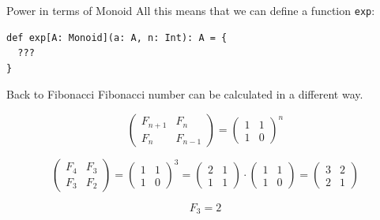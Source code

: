 \documentclass[presentation,aspectratio=169,smaller]{beamer}
\begin{document}
\begin{frame}[label={sec:orgb38177f},fragile]{Power in terms of Monoid}
 All this means that we can define a function \texttt{exp}:

\begin{verbatim}
def exp[A: Monoid](a: A, n: Int): A = {
  ???
}
\end{verbatim}
\end{frame}

\begin{frame}[label={sec:org682ba9d}]{Back to Fibonacci}
Fibonacci number can be calculated in a different way.

\begin{equation*}
  \begin{pmatrix}
    F_{n+1} & F_n \\
    F_n & F_{n-1}
  \end{pmatrix} =
  \begin{pmatrix}
    1 & 1 \\
    1 & 0
  \end{pmatrix} ^ n
\end{equation*}

\pause

\begin{equation*}
  \begin{pmatrix}
    F_4 & F_3 \\
    F_3 & F_2
  \end{pmatrix} =
  \begin{pmatrix}
    1 & 1 \\
    1 & 0
  \end{pmatrix} ^ 3 =
  \begin{pmatrix}
    2 & 1 \\
    1 & 1
  \end{pmatrix} \cdot
  \begin{pmatrix}
    1 & 1 \\
    1 & 0
  \end{pmatrix} =
  \begin{pmatrix}
    3 & 2 \\
    2 & 1
  \end{pmatrix}
\end{equation*}

\pause

\begin{equation*}
  F_3 = 2
\end{equation*}
\end{frame}
\end{document}
